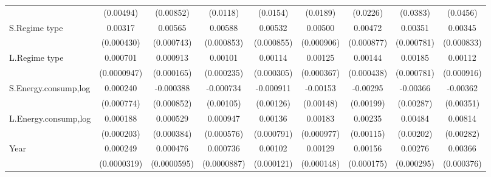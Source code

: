 \begin{table}[htbp]
\begin{tabular}{l*{8}{c}}
                    &   (0.00494)         &   (0.00852)         &    (0.0118)         &    (0.0154)         &    (0.0189)         &    (0.0226)         &    (0.0383)         &    (0.0456)         \\
[1em]
S.Regime type       &     0.00317\sym{***}&     0.00565\sym{***}&     0.00588\sym{***}&     0.00532\sym{***}&     0.00500\sym{***}&     0.00472\sym{***}&     0.00351\sym{***}&     0.00345\sym{***}\\
                    &  (0.000430)         &  (0.000743)         &  (0.000853)         &  (0.000855)         &  (0.000906)         &  (0.000877)         &  (0.000781)         &  (0.000833)         \\
[1em]
L.Regime type       &    0.000701\sym{***}&    0.000913\sym{***}&     0.00101\sym{***}&     0.00114\sym{***}&     0.00125\sym{***}&     0.00144\sym{***}&     0.00185\sym{**} &     0.00112         \\
                    & (0.0000947)         &  (0.000165)         &  (0.000235)         &  (0.000305)         &  (0.000367)         &  (0.000438)         &  (0.000781)         &  (0.000916)         \\
[1em]
S.Energy.consump,log&    0.000240         &   -0.000388         &   -0.000734         &   -0.000911         &    -0.00153         &    -0.00295         &    -0.00366         &    -0.00362         \\
                    &  (0.000774)         &  (0.000852)         &   (0.00105)         &   (0.00126)         &   (0.00148)         &   (0.00199)         &   (0.00287)         &   (0.00351)         \\
[1em]
L.Energy.consump,log&    0.000188         &    0.000529         &    0.000947         &     0.00136\sym{*}  &     0.00183\sym{*}  &     0.00235\sym{**} &     0.00484\sym{**} &     0.00814\sym{***}\\
                    &  (0.000203)         &  (0.000384)         &  (0.000576)         &  (0.000791)         &  (0.000977)         &   (0.00115)         &   (0.00202)         &   (0.00282)         \\
[1em]
Year                &    0.000249\sym{***}&    0.000476\sym{***}&    0.000736\sym{***}&     0.00102\sym{***}&     0.00129\sym{***}&     0.00156\sym{***}&     0.00276\sym{***}&     0.00366\sym{***}\\
                    & (0.0000319)         & (0.0000595)         & (0.0000887)         &  (0.000121)         &  (0.000148)         &  (0.000175)         &  (0.000295)         &  (0.000376)         \\

\end{tabular}
\end{table}
